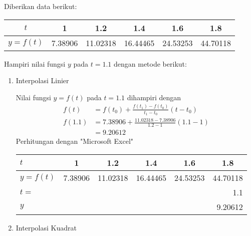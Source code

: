 \documentclass[12pt]{article}
\begin{document}
Diberikan data berikut:
\begin{longtable}[c]{|c|c|c|c|c|c|}
    \hline
    $t$        & 1       & 1.2      & 1.4      & 1.6      & 1.8      \\ \hline
    $y = f(t)$ & 7.38906 & 11.02318 & 16.44465 & 24.53253 & 44.70118 \\ \hline
\end{longtable}
Hampiri nilai fungsi $ y $ pada $ t = 1.1 $ dengan metode berikut:
\begin{enumerate}
    \item {
        Interpolasi Linier

        Nilai fungsi $ y = f(t) $ pada $ t = 1.1 $ dihampiri dengan
        \begin{align*}
            f(t)    & = f(t_0) + \frac{f(t_1) - f(t_0)}{t_1 - t_0}(t - t_0) \\
            f(1.1)  & = 7.38906 + \frac{11.02318 - 7.38906}{1.2 - 1}(1.1 - 1) \\
                    & = 9.20612
        \end{align*}
        Perhitungan dengan "Microsoft Excel"
        \begin{longtable}[c]{|l|c|c|c|c|c|}
            \hline
            $t$        & 1       & 1.2      & 1.4      & 1.6      & 1.8      \\ \hline
            $y = f(t)$ & 7.38906 & 11.02318 & 16.44465 & 24.53253 & 44.70118 \\ \hline
            $ t= $     & \multicolumn{5}{|r|}{1.1} \\ \hline
            $ y $      & \multicolumn{5}{|r|}{9.20612} \\ \hline
        \end{longtable}
    }
    \item {
        Interpolasi Kuadrat

}
\end{enumerate}
\end{document}
